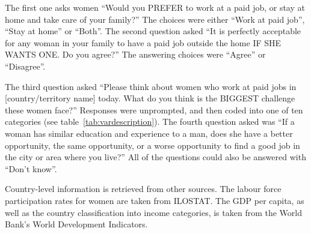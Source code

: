 The first one asks women \enquote{Would you PREFER to work at a paid job, or stay at home and take care of your family?} The choices were either \enquote{Work at paid job}, \enquote{Stay at home} or \enquote{Both}. The second question asked \enquote{It is perfectly acceptable for any woman in your family to have a paid job outside the home IF SHE WANTS ONE. Do you agree?} The answering choices were \enquote{Agree} or \enquote{Disagree}.

The third question asked \enquote{Please think about women who work at paid jobs in [country/territory name] today. What do you think is the BIGGEST challenge these women face?} Responses were unprompted, and then coded into one of ten categories (see table~\ref{tab:vardescription}). The fourth question asked was \enquote{If a woman has similar education and experience to a man, does she have a better opportunity, the same opportunity, or a worse opportunity to find a good job in the city or area where you live?} All of the questions could also be answered with \enquote{Don't know}.

Country-level information is retrieved from other sources. The labour force participation rates for women are taken from ILOSTAT. The GDP per capita, as well as the country classification into income categories, is taken from the World Bank's World Development Indicators.

